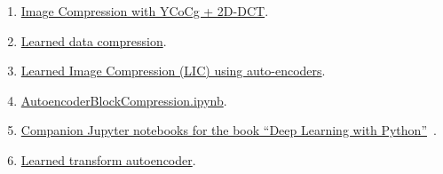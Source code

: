 \begin{enumerate}
\item
  \href{https://github.com/vicente-gonzalez-ruiz/DCT2D/blob/master/src/DCT2D/YCoCg_2D_DCT_SQ.ipynb}{Image
    Compression with YCoCg + 2D-DCT}.
\item
  \href{https://www.tensorflow.org/tutorials/generative/data_compression}{Learned
    data compression}.
\item
  \href{https://github.com/vicente-gonzalez-ruiz/learned_image_compression/blob/main/notebooks/LIC.ipynb}{Learned
    Image Compression (LIC) using auto-encoders}.
\item
  \href{https://github.com/vicente-gonzalez-ruiz/learned_image_compression/blob/main/notebooks/AutoencoderBlockCompression.ipynb}{AutoencoderBlockCompression.ipynb}.
\item
  \href{https://github.com/fchollet/deep-learning-with-python-notebooks}{Companion
    Jupyter notebooks for the book ``Deep Learning with
    Python''}~\cite{chollet2021deep}.
\item
  \href{https://github.com/Sistemas-Multimedia/Sistemas-Multimedia.github.io/blob/master/contents/spatial_transforms/notebooks/learned_transform_autoencoder.ipynb}{Learned
    transform autoencoder}.
\end{enumerate}


